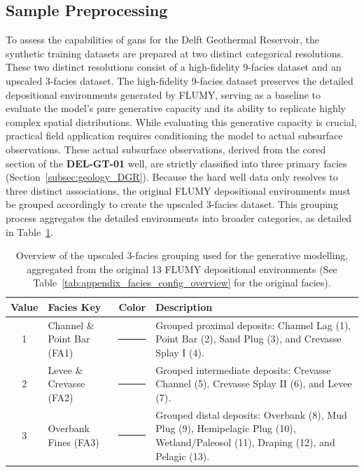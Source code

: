 \subsection{Sample Preprocessing}
To assess the capabilities of \glspl{gan} for the Delft Geothermal Reservoir, the synthetic training datasets are prepared at two distinct categorical resolutions. These two distinct resolutions consist of a high-fidelity 9-facies dataset and an upscaled 3-facies dataset. The high-fidelity 9-facies dataset preserves the detailed depositional environments generated by FLUMY, serving as a baseline to evaluate the model's pure generative capacity and its ability to replicate highly complex spatial distributions. While evaluating this generative capacity is crucial, practical field application requires conditioning the model to actual subsurface observations. These actual subsurface observations, derived from the cored section of the \textbf{DEL-GT-01} well, are strictly classified into three primary facies (Section~\ref{subsec:geology_DGR}). Because the hard well data only resolves to three distinct associations, the original FLUMY depositional environments must be grouped accordingly to create the upscaled 3-facies dataset. This grouping process aggregates the detailed environments into broader categories, as detailed in Table~\ref{tab:3_facies_grouping}.

\begin{table}[htbp]
    \centering
    \renewcommand{\arraystretch}{1.4}
    \begin{tabular}{c p{} l p{}}
        \hline
        \textbf{Value} & \textbf{Facies Key} & \textbf{Color} & \textbf{Description} \\
        \hline
        1 & Channel \& Point Bar (FA1) & \textcolor[HTML]{F3DD12}{\rule{10pt}{10pt}} & Grouped proximal deposits: Channel Lag (1), Point Bar (2), Sand Plug (3), and Crevasse Splay I (4). \\
        2 & Levee \& Crevasse (FA2) & \textcolor[HTML]{27AE60}{\rule{10pt}{10pt}} & Grouped intermediate deposits: Crevasse Channel (5), Crevasse Splay II (6), and Levee (7). \\
        3 & Overbank Fines (FA3) & \textcolor[HTML]{33FF00}{\rule{10pt}{10pt}} & Grouped distal deposits: Overbank (8), Mud Plug (9), Hemipelagic Plug (10), Wetland/Paleosol (11), Draping (12), and Pelagic (13). \\
        \hline
    \end{tabular}
    \caption{Overview of the upscaled 3-facies grouping used for the generative modelling, aggregated from the original 13 FLUMY depositional environments (See Table~\ref{tab:appendix_facies_config_overview} for the original facies).}
    \label{tab:3_facies_grouping}
\end{table}

